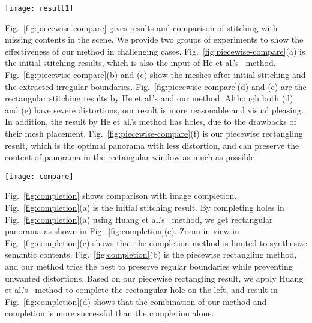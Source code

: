\documentclass[10pt,journal,compsoc]{IEEEtran}
\begin{document}
 \begin{figure*} %
  \centering
  \texttt{[image: result1]}
  \caption{Comparison with state-of-the-art methods. (a) Chen's~\cite{conf/eccv/ChenC16} stitching with global prior. (b) He et al.'s~\cite{journals/tog/HeC013} rectangling stitching. (c) and (d) are Our piecewise rectangling results in the $1_{st}$ iteration with and without line preserving). (e) our final stitching results after several iterations. } \label{fig:result_office}
\end{figure*}

Fig.~\ref{fig:piecewise-compare} gives results and comparison of stitching with missing contents in the scene. 
We provide two groups of experiments to show the effectiveness of our method in challenging cases. 
Fig.~\ref{fig:piecewise-compare}(a) is the initial stitching results, which is also the input of He et al.'s~\cite{journals/tog/HeC013} method. 
Fig.~\ref{fig:piecewise-compare}(b) and (c) show the meshes after initial stitching and the extracted irregular boundaries.
Fig.~\ref{fig:piecewise-compare}(d) and (e) are the rectangular stitching results by He et al.'s and our method.
 Although both (d) and (e) have severe distortions, our result is more reasonable and visual pleasing. 
 In addition, the result by He et al.'s method has holes, due to the drawbacks of their mesh placement. 
 Fig.~\ref{fig:piecewise-compare}(f) is our piecewise rectangling result, which is the optimal panorama with less distortion, 
 and can preserve the content of panorama in the rectangular window as much as possible.

\begin{figure*}
  \centering
  \texttt{[image: compare]}
  \caption{Results and comparison of stitching with missing contents. There are two sets of results, and each set is as follows: (a) Initial stitching result with irregular boundaries. (b)  Warped meshes of initial stitching. (c) Irregular boundary extraction. (d) and (e) are rectangling stitching by He's~\cite{journals/tog/HeC013} and our method respectively. (f) our piecewise rectangular stitching result.} \label{fig:piecewise-compare}
\end{figure*}

Fig.~\ref{fig:completion} shows comparison with image completion. 
Fig.~\ref{fig:completion}(a) is the initial stitching result. 
By completing holes in Fig.~\ref{fig:completion}(a) using Huang et al.'s~\cite{journals/tog/HuangKAK14} method, we get rectangular panorama as shown in Fig.~\ref{fig:completion}(c). 
Zoom-in view in Fig.~\ref{fig:completion}(c) shows that the completion method is limited to synthesize semantic contents. 
Fig.~\ref{fig:completion}(b) is the piecewise rectangling method, and our method tries the best to preserve regular boundaries while preventing unwanted distortions. 
Based on our piecewise rectangling result,  we apply Huang et al.'s~\cite{journals/tog/HuangKAK14} method to complete the rectangular hole on the left, 
and result in Fig.~\ref{fig:completion}(d) shows that the combination of our method and completion is more successful than the completion alone.
\end{document}
